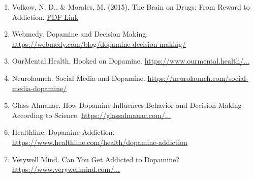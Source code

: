 \documentclass[a4paper,10pt,twocolumn]{memoir}
\begin{document}
{\begin{enumerate}
    \item Volkow, N. D., \& Morales, M. (2015). The Brain on Drugs: From Reward to Addiction. \href{https://www.cell.com/neuron/pdf/S0896-6273(15)00133-6.pdf}{PDF Link}
    \item Webmedy. Dopamine and Decision Making. \href{https://webmedy.com/blog/dopamine-decision-making/}{https://webmedy.com/blog/dopamine-decision-making/}
    \item OurMental.Health. Hooked on Dopamine. \href{https://www.ourmental.health/screen-time-sanity/hooked-on-dopamine-how-social-media-hijacks-your-brain}{https://www.ourmental.health/...}
    \item Neurolaunch. Social Media and Dopamine. \href{https://neurolaunch.com/social-media-dopamine/}{https://neurolaunch.com/social-media-dopamine/}
    \item Glass Almanac. How Dopamine Influences Behavior and Decision-Making According to Science. \href{https://glassalmanac.com/how-dopamine-influences-behavior-and-decision-making-according-to-science/}{https://glassalmanac.com/...}
    \item Healthline. Dopamine Addiction. \href{https://www.healthline.com/health/dopamine-addiction}{https://www.healthline.com/health/dopamine-addiction}
    \item Verywell Mind. Can You Get Addicted to Dopamine? \href{https://www.verywellmind.com/can-you-get-addicted-to-dopamine-5207433}{https://www.verywellmind.com/...}
\end{enumerate} 

\clearpage



}
\end{document}
